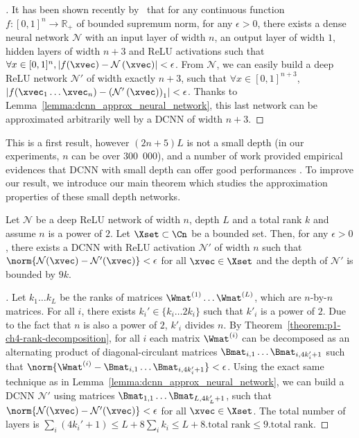 \begin{proof}[]
It has been shown recently by~\citet{hanin2017universal} that for any continuous function $f:[0,1]^{n} \rightarrow \mathbb{R}_+$ of bounded supremum norm, for any $\epsilon>0$, there exists a dense neural network $\mathcal{N}$ with an input layer of width $n$, an output layer of width $1$, hidden layers of width $n+3$ and ReLU activations such that $\forall x \in [0,1]^n, \left| f(\xvec) - \mathcal{N} \left(\xvec\right)\right| < \epsilon$. From $\mathcal{N}$, we can easily build a deep ReLU network $\mathcal{N'}$ of width exactly $n+3$, such that $\forall x \in [0,1]^{n+3}$, $\left|f(\xvec_{1} \ldots \xvec_{n}) - \left(\mathcal{N}'\left(\xvec\right)\right)_{1}\right| < \epsilon$. Thanks to Lemma~\ref{lemma:dcnn_approx_neural_network}, this last network can be approximated arbitrarily well by a DCNN of width $n+3$.
\end{proof}


This is a first result, however $(2n+5)L$ is not a small depth (in our experiments, $n$ can be over 300~000), and a number of work provided empirical evidences that DCNN with small depth can offer good performances \cite{araujo2018training,cheng2015exploration}.
To improve our result, we introduce our main theorem which studies the approximation properties of these small depth networks.

\begin{theorem} \label{theorem:p1-ch4-low_rank_nn}
  Let $\mathcal{N}$ be a deep ReLU network of width $n$, depth $L$ and a total rank $k$ and assume $n$ is a power of $2$.
  Let $\Xset \subset \Cn$ be a bounded set.
  Then, for any $\epsilon > 0$, there exists a DCNN with ReLU activation $\mathcal{N}'$ of width $n$ such that $\norm{ \mathcal{N}(\xvec) - \mathcal{N}'(\xvec)} < \epsilon$ for all $\xvec \in \Xset$ and the depth of $\mathcal{N}'$ is bounded by $9k$.
\end{theorem}

\begin{proof}[]
  Let $k_{1} \ldots k_{L}$ be the ranks of matrices $\Wmat^{(1)} \ldots \Wmat^{(L)}$, which are $n$-by-$n$ matrices.
  For all $i$, there exists $k_{i}' \in \{k_{i} \ldots 2k_{i}\}$ such that $k'_{i}$ is a power of $2$.
  Due to the fact that $n$ is also a power of $2$, $k'_{i}$ divides $n$.
  By Theorem~\ref{theorem:p1-ch4-rank-decomposition}, for all $i$ each matrix $\Wmat^{(i)}$ can be decomposed as an alternating product of diagonal-circulant matrices $\Bmat_{i,1} \ldots \Bmat_{i,4k'_{i}+1}$ such that $\norm{ \Wmat^{(i)} - \Bmat_{i,1} \ldots \Bmat_{i,4k'_{i}+1}} < \epsilon$.
  Using the exact same technique as in Lemma~\ref{lemma:dcnn_approx_neural_network}, we can build a DCNN $\mathcal{N}'$ using matrices $\Bmat_{1,1} \ldots \Bmat_{L,4k'_{L}+1}$, such that $\norm{ \mathcal{N}(\xvec) - \mathcal{N}'(\xvec)} < \epsilon$ for all $\xvec \in \Xset$.
  The total number of layers is $\sum_{i}\left(4k_{i}'+1\right)\le L+8\sum_{i}k_{i}\le L+8.
  \textrm{total rank} \le 9.\textrm{total rank}$.
\end{proof}

